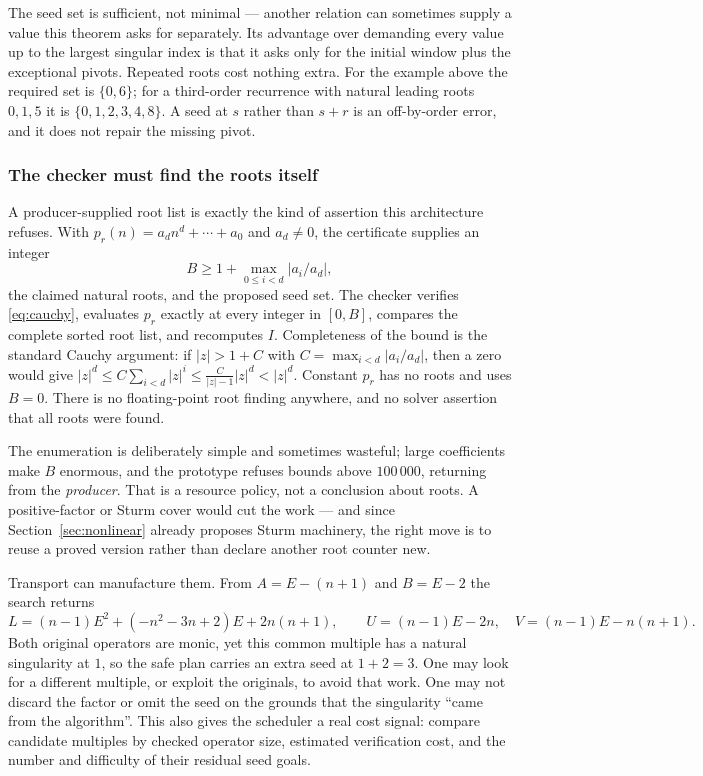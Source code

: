 The seed set is sufficient, not minimal --- another relation can sometimes
supply a value this theorem asks for separately. Its advantage over demanding
every value up to the largest singular index is that it asks only for the
initial window plus the exceptional pivots. Repeated roots cost nothing extra.
For the example above the required set is $\{0,6\}$; for a third-order
recurrence with natural leading roots $0,1,5$ it is $\{0,1,2,3,4,8\}$. A seed at
$s$ rather than $s+r$ is an off-by-order error, and it does not repair the
missing pivot.

\subsubsection*{The checker must find the roots itself}

A producer-supplied root list is exactly the kind of assertion this architecture
refuses. With $p_r(n)=a_dn^d+\cdots+a_0$ and $a_d\ne0$, the certificate supplies
an integer
\begin{equation}\label{eq:cauchy}
 B\ge1+\max_{0\le i<d}\left|a_i/a_d\right|,
\end{equation}
the claimed natural roots, and the proposed seed set. The checker verifies
\eqref{eq:cauchy}, evaluates $p_r$ exactly at every integer in $[0,B]$, compares
the complete sorted root list, and recomputes $I$. Completeness of the bound is
the standard Cauchy argument: if $|z|>1+C$ with $C=\max_{i<d}|a_i/a_d|$, then a
zero would give
$|z|^d\le C\sum_{i<d}|z|^i\le \frac{C}{|z|-1}|z|^d<|z|^d$.
Constant $p_r$ has no roots and uses $B=0$. There is no floating-point root
finding anywhere, and no solver assertion that all roots were found.

The enumeration is deliberately simple and sometimes wasteful; large
coefficients make $B$ enormous, and the prototype refuses bounds above
$100\,000$, returning \unknown{} from the \emph{producer}. That is a resource
policy, not a conclusion about roots. A positive-factor or Sturm cover would cut
the work --- and since Section~\ref{sec:nonlinear} already proposes Sturm
machinery, the right move is to reuse a proved version rather than declare
another root counter new.

\begin{remark}
Transport can manufacture them. From $A=E-(n+1)$ and $B=E-2$ the search returns
\[
 L=(n-1)E^2+(-n^2-3n+2)E+2n(n+1),
\qquad
 U=(n-1)E-2n,\quad V=(n-1)E-n(n+1).
\]
Both original operators are monic, yet this common multiple has a natural
singularity at $1$, so the safe plan carries an extra seed at $1+2=3$. One may
look for a different multiple, or exploit the originals, to avoid that work. One
may not discard the factor or omit the seed on the grounds that the singularity
``came from the algorithm''. This also gives the scheduler a real cost signal:
compare candidate multiples by checked operator size, estimated verification
cost, and the number and difficulty of their residual seed goals.
\end{remark}

